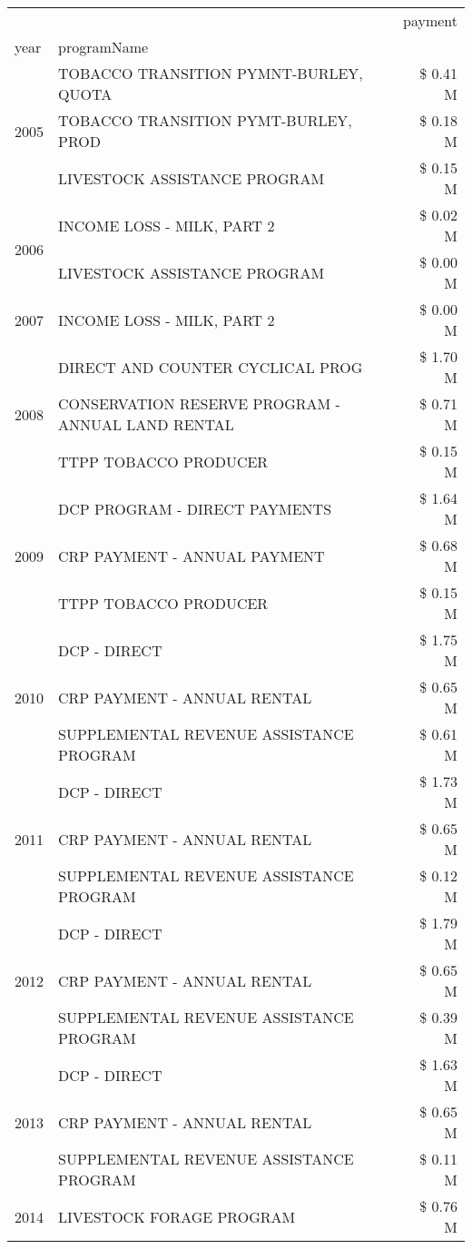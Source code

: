\begin{tabular}{llr}
\toprule
 &  & payment \\
year & programName &  \\
\midrule
\multirow[t]{3}{*}{2005} & TOBACCO TRANSITION PYMNT-BURLEY, QUOTA & \$ 0.41 M \\
 & TOBACCO TRANSITION PYMT-BURLEY, PROD & \$ 0.18 M \\
 & LIVESTOCK ASSISTANCE PROGRAM & \$ 0.15 M \\
\cline{1-3}
\multirow[t]{2}{*}{2006} & INCOME LOSS - MILK, PART 2 & \$ 0.02 M \\
 & LIVESTOCK ASSISTANCE PROGRAM & \$ 0.00 M \\
\cline{1-3}
2007 & INCOME LOSS - MILK, PART 2 & \$ 0.00 M \\
\cline{1-3}
\multirow[t]{3}{*}{2008} & DIRECT AND COUNTER CYCLICAL PROG & \$ 1.70 M \\
 & CONSERVATION RESERVE PROGRAM - ANNUAL LAND RENTAL & \$ 0.71 M \\
 & TTPP TOBACCO PRODUCER & \$ 0.15 M \\
\cline{1-3}
\multirow[t]{3}{*}{2009} & DCP PROGRAM - DIRECT PAYMENTS & \$ 1.64 M \\
 & CRP PAYMENT - ANNUAL PAYMENT & \$ 0.68 M \\
 & TTPP TOBACCO PRODUCER & \$ 0.15 M \\
\cline{1-3}
\multirow[t]{3}{*}{2010} & DCP - DIRECT & \$ 1.75 M \\
 & CRP PAYMENT - ANNUAL RENTAL & \$ 0.65 M \\
 & SUPPLEMENTAL REVENUE ASSISTANCE PROGRAM & \$ 0.61 M \\
\cline{1-3}
\multirow[t]{3}{*}{2011} & DCP - DIRECT & \$ 1.73 M \\
 & CRP PAYMENT - ANNUAL RENTAL & \$ 0.65 M \\
 & SUPPLEMENTAL REVENUE ASSISTANCE PROGRAM & \$ 0.12 M \\
\cline{1-3}
\multirow[t]{3}{*}{2012} & DCP - DIRECT & \$ 1.79 M \\
 & CRP PAYMENT - ANNUAL RENTAL & \$ 0.65 M \\
 & SUPPLEMENTAL REVENUE ASSISTANCE PROGRAM & \$ 0.39 M \\
\cline{1-3}
\multirow[t]{3}{*}{2013} & DCP - DIRECT & \$ 1.63 M \\
 & CRP PAYMENT - ANNUAL RENTAL & \$ 0.65 M \\
 & SUPPLEMENTAL REVENUE ASSISTANCE PROGRAM & \$ 0.11 M \\
\cline{1-3}
\multirow[t]{3}{*}{2014} & LIVESTOCK FORAGE PROGRAM & \$ 0.76 M \\

\end{tabular}
